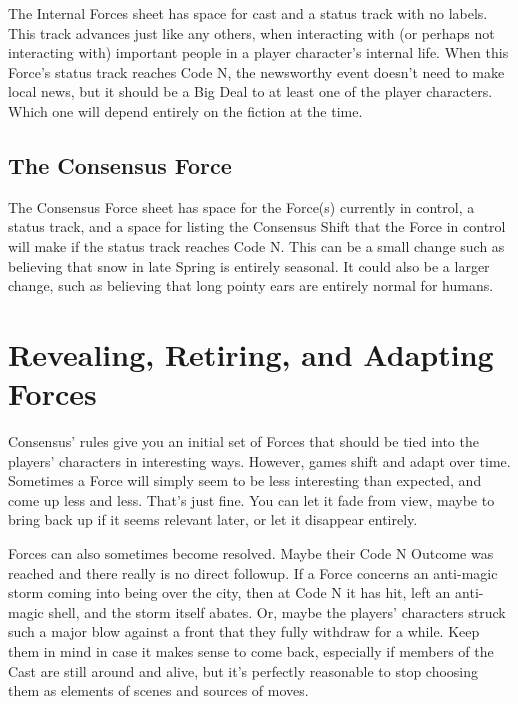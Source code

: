 \documentclass[10pt,twoside,openright]{memoir}
\begin{document}
The Internal Forces sheet has space for cast and a status track with no
labels. This track advances just like any others, when interacting with
(or perhaps not interacting with) important people in a player
character's internal life. When this Force's status track reaches Code
N, the newsworthy event doesn't need to make local news, but it should
be a Big Deal to at least one of the player characters. Which one will
depend entirely on the fiction at the time.

\hypertarget{the-consensus-force}{%
\subsection{The Consensus Force}\label{the-consensus-force}}

The Consensus Force sheet has space for the Force(s) currently in
control, a status track, and a space for listing the Consensus Shift
that the Force in control will make if the status track reaches Code N.
This can be a small change such as believing that snow in late Spring is
entirely seasonal. It could also be a larger change, such as believing
that long pointy ears are entirely normal for humans.

\hypertarget{revealing-retiring-and-adapting-forces}{%
\section{Revealing, Retiring, and Adapting
Forces}\label{revealing-retiring-and-adapting-forces}}

Consensus' rules give you an initial set of Forces that should be tied
into the players' characters in interesting ways. However, games shift
and adapt over time. Sometimes a Force will simply seem to be less
interesting than expected, and come up less and less. That's just fine.
You can let it fade from view, maybe to bring back up if it seems
relevant later, or let it disappear entirely.

Forces can also sometimes become resolved. Maybe their Code N Outcome
was reached and there really is no direct followup. If a Force concerns
an anti-magic storm coming into being over the city, then at Code N it
has hit, left an anti-magic shell, and the storm itself abates. Or,
maybe the players' characters struck such a major blow against a front
that they fully withdraw for a while. Keep them in mind in case it makes
sense to come back, especially if members of the Cast are still around
and alive, but it's perfectly reasonable to stop choosing them as
elements of scenes and sources of moves.
\end{document}
